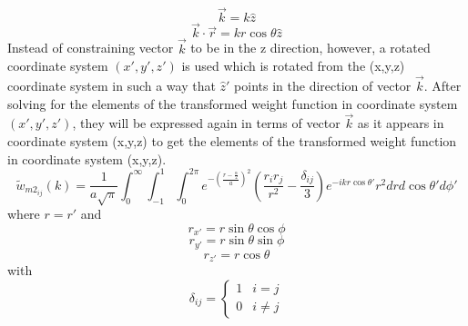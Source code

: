 \documentclass[double,12pt]{beavtex}
\begin{document}
\begin{equation}{\vec{k}=k\hat{z}}\end{equation}
\begin{equation}{\vec{k}\cdot\vec{r}=kr\cos\theta\hat{z}}\end{equation}
Instead of constraining vector $\vec{k}$ to be in the z direction, however, a rotated coordinate system $(x',y',z')$ is used which is rotated from the (x,y,z) coordinate system in such a way that $\hat{z}'$ points in the direction of vector $\vec{k}$. After solving for the elements of the transformed weight function in coordinate system $(x',y',z')$, they will be expressed again in terms of vector $\vec{k}$ as it appears in coordinate system (x,y,z) to get the elements of the transformed weight function in coordinate system (x,y,z).%
\begin{equation}{\widetilde{w}_{m2_{ij}}(k)=\frac{1}{a\sqrt{\pi}}\int_{0}^{\infty}\int_{-1}^{1}\int_{0}^{2\pi}e^{-\left(\frac{r-\frac{\alpha}{2}}{a}\right)^2}\left(\frac{r_ir_j}{r^2}-\frac{\delta_{ij}}{3}\right)e^{-ikr\cos\theta'}r^2d{r}d{\cos\theta'}d{\phi'}}\end{equation}
where $r=r'$ and
\begin{displaymath}{r_{x'}=r\sin\theta\cos\phi}\end{displaymath}
\begin{displaymath}{r_{y'}=r\sin\theta\sin\phi}\end{displaymath}
\begin{displaymath}{r_{z'}=r\cos\theta}\end{displaymath} 
with
\begin{displaymath}{\delta_{ij}=\left\{ \begin{array}{rc} 1 & i = j \\ 0  & i\neq j \end{array}\right.}\end{displaymath}
\[{}\]
\end{document}
